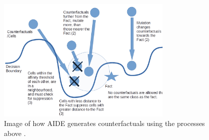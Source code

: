 \begin{figure}[h]
    \centering
    \includegraphics[width=0.75\textwidth]{images/aide.png}
    \caption{Image of how AIDE generates counterfactuals using the processes above \cite{forrest2021contrastive}.}
    \label{fig:aide}
\end{figure}

